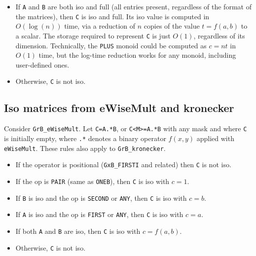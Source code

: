 \documentclass[12pt]{article}
\begin{document}
{\begin{itemize}
    \item If \verb'A' and \verb'B' are both iso and full (all entries present,
    regardless of the format of the matrices), then \verb'C' is iso and full.
    Its iso value is computed in $O(\log(n))$ time, via a reduction of $n$
    copies of the value $t=f(a,b)$ to a scalar.  The storage required to
    represent \verb'C' is just $O(1)$, regardless of its dimension.
    Technically, the \verb'PLUS' monoid could be computed as $c=nt$ in $O(1)$
    time, but the log-time reduction works for any monoid, including
    user-defined ones.

    \item Otherwise, \verb'C' is not iso.
    \end{itemize}

\subsection{Iso matrices from eWiseMult and kronecker}
\label{iso_emult}

Consider \verb'GrB_eWiseMult'.  Let
\verb'C=A.*B', or \verb'C<M>=A.*B' with any mask and where \verb'C' is
initially empty, where \verb'.*' denotes a binary operator $f(x,y)$
applied with \verb'eWiseMult'.  These rules also apply to \verb'GrB_kronecker'.

    \begin{itemize}
    \item If the operator is positional (\verb'GxB_FIRSTI' and related) then
    \verb'C' is not iso.

    \item If the op is \verb'PAIR' (same as \verb'ONEB'),
        then \verb'C' is iso with $c=1$.

    \item If \verb'B' is iso and the op is \verb'SECOND' or \verb'ANY',
        then \verb'C' is iso with $c=b$.

    \item If \verb'A' is iso and the op is \verb'FIRST' or \verb'ANY',
        then \verb'C' is iso with $c=a$.

    \item If both \verb'A' and \verb'B' are iso,
        then \verb'C' is iso with $c=f(a,b)$.

    \item Otherwise, \verb'C' is not iso.
    \end{itemize}

}
\end{document}
